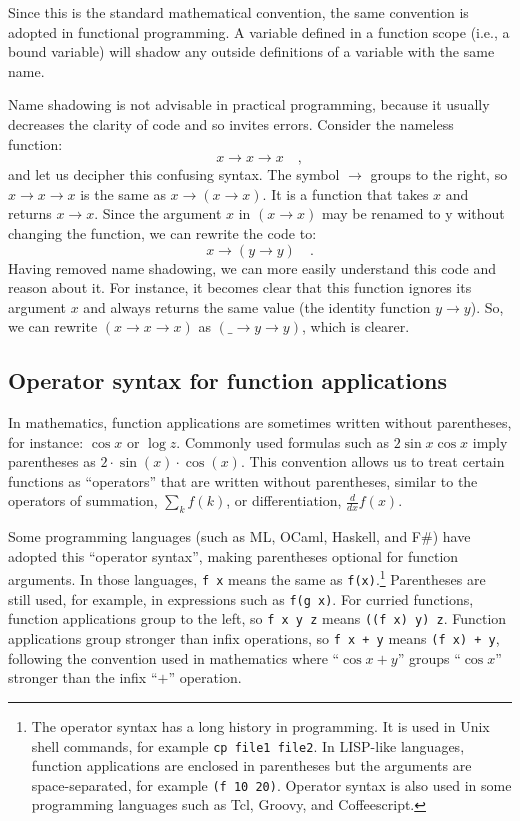 Since this is the standard mathematical convention, the same convention
is adopted in functional programming. A variable defined in a function
scope (i.e., a bound variable) will shadow any outside definitions
of a variable with the same name.

Name shadowing is not advisable in practical programming, because
it usually decreases the clarity of code and so invites errors. Consider
the nameless function:
\[
x\rightarrow x\rightarrow x\quad,
\]
and let us decipher this confusing syntax. The symbol $\rightarrow$
groups to the right, so $x\rightarrow x\rightarrow x$ is the same
as $x\rightarrow\left(x\rightarrow x\right)$. It is a function that
takes $x$ and returns $x\rightarrow x$. Since the argument $x$
in $\left(x\rightarrow x\right)$ may be renamed to y without changing
the function, we can rewrite the code to:
\[
x\rightarrow\left(y\rightarrow y\right)\quad.
\]
Having removed name shadowing, we can more easily understand this
code and reason about it. For instance, it becomes clear that this
function ignores its argument $x$ and always returns the same value
(the identity function $y\rightarrow y$). So, we can rewrite $\left(x\rightarrow x\rightarrow x\right)$
as $\left(\_\rightarrow y\rightarrow y\right)$, which is clearer.

\subsection{Operator syntax for function applications}

In mathematics, function applications are sometimes written without
parentheses, for instance: $\cos x$ or $\log z$. Commonly used formulas
such as $2\sin x\cos x$ imply parentheses as $2\cdot\sin\left(x\right)\cdot\cos\left(x\right)$.
This convention allows us to treat certain functions as \textsf{``}operators\textsf{''}
that are written without parentheses, similar to the operators of
summation, $\sum_{k}f(k)$, or differentiation, $\frac{d}{dx}f(x)$.

Some programming languages (such as ML, OCaml, Haskell, and F\#) have
adopted this \textsf{``}operator syntax\textsf{''}, making
parentheses optional for function arguments. In those languages, \lstinline!f x!
means the same as \lstinline!f(x)!.\footnote{The operator syntax has a long history in programming. It is used
in Unix shell commands, for example \lstinline!cp file1 file2!. In
LISP-like languages, function applications are enclosed in parentheses
but the arguments are space-separated, for example \lstinline!(f 10 20)!.
Operator syntax is also used in some programming languages such as
Tcl, Groovy, and Coffeescript.} Parentheses are still used, for example, in expressions such as \lstinline!f(g x)!.
For curried functions, function applications group to the left, so
\lstinline!f x y z! means \lstinline!((f x) y) z!. Function applications
group stronger than infix operations, so \lstinline!f x + y! means
\lstinline!(f x) + y!, following the convention used in mathematics
where \textsf{``}$\cos x+y$\textsf{''} groups \textsf{``}$\cos x$\textsf{''} stronger than the infix
\textsf{``}$+$\textsf{''} operation.

